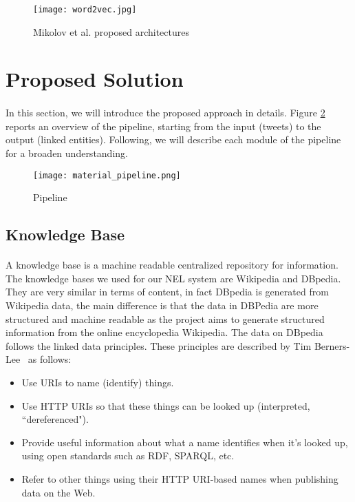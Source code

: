 \vspace{-5pt}
\begin{figure}[h!]
\texttt{[image: word2vec.jpg]}
\caption{Mikolov et al. proposed architectures}
\label{fig:w2v}
\end{figure}
\vspace{-15pt}

\section{Proposed Solution}
\paragraph{}In this section, we will introduce the proposed approach in details. Figure \ref{fig:pipeline} reports an overview of the pipeline, starting from the input (tweets) to the output (linked entities). Following, we will describe each module of the pipeline for a broaden understanding.

\vspace{-10pt}
\begin{figure}[h!]
\texttt{[image: material\_pipeline.png]}  
\caption{Pipeline}
\label{fig:pipeline}
\end{figure}
\vspace{-10pt}

\subsection{Knowledge Base}
\paragraph{}
A knowledge base is a machine readable centralized repository for information. The knowledge bases we used for our NEL system are Wikipedia and DBpedia. They are very similar in terms of content, in fact DBpedia is generated from Wikipedia data, the main difference is that the data in DBPedia are more structured and machine readable as the project aims to generate structured information from the online encyclopedia Wikipedia. The data on DBpedia follows the linked data principles. These principles are described by Tim Berners-Lee~\cite{timbernerslee2006linkeddata} as follows:

\begin{itemize}[itemsep = 0.1em]
\item Use URIs to name (identify) things.
\item Use HTTP URIs so that these things can be looked up (interpreted, ``dereferenced").
\item Provide useful information about what a name identifies when it's looked up, using open standards such as RDF, SPARQL, etc.
\item Refer to other things using their HTTP URI-based names when publishing data on the Web.
\end{itemize}

